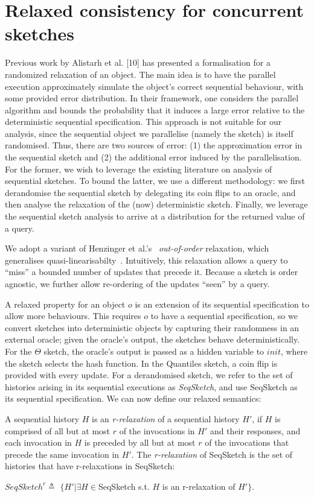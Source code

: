 \section{Relaxed consistency for concurrent sketches}
\label{sec:concurrentSketches}

Previous work by Alistarh et al. [10] has presented a formalisation for a randomized relaxation of an object.
The main idea is to have the parallel execution approximately simulate the object’s correct sequential behaviour, with some provided error distribution.
In their framework, one considers the parallel algorithm and bounds the probability that it induces a large error
 relative to the deterministic sequential specification.
This approach is not suitable for our analysis, since the sequential object we parallelise (namely the sketch) is
itself randomised. Thus, there are two sources of error: (1) the approximation error in the sequential sketch and
(2) the additional error induced by the parallelisation. For the former, we wish to leverage the
existing literature on analysis of sequential sketches. To bound the latter, we use a different
methodology: we first derandomise the sequential sketch by delegating its coin flips to an oracle,
and then analyse the relaxation of the (now) deterministic sketch. Finally, we leverage the sequential sketch
analysis to arrive at a distribution for the returned value of a query.


We adopt a variant of Henzinger et al.'s~\cite{Henzinger} {\emph{out-of-order}} relaxation,  
which generalises quasi-linearisabilty~\cite{afek2010quasi}.
Intuitively, this relaxation allows a query to ``miss'' a bounded number of updates that precede it.
Because a sketch is order agnostic, we further allow re-ordering of the updates ``seen'' by a query.

A relaxed property for an object $o$ is an
extension of its sequential specification to allow more behaviours.
This requires $o$ to have a sequential specification, so
we convert sketches into deterministic objects by capturing their randomness in an external oracle; 
given the oracle's output, the sketches behave deterministically.
For the $\Theta$ sketch, the oracle's output is passed as a hidden variable to $init$, where the sketch
selects the hash function. In the Quantiles sketch, a coin flip is provided with every update.
For a derandomised sketch, we refer to the set of histories arising in its sequential
executions as \emph{SeqSketch}, and use SeqSketch as its sequential specification.
We can now define our relaxed semantics:
\begin{definition}[r-relaxation]
  A sequential history $H$ is an \emph{r-relaxation} of a sequential history $H'$,
  if $H$ is comprised of all but at most $r$ of the invocations in $H'$ and their responses,
  and each invocation in $H$ is preceded by all but at most $r$ of the invocations that precede the 
  same invocation in $H'$. The \emph{r-relaxation} of SeqSketch is the set of histories
  that have r-relaxations in SeqSketch:
  
  $SeqSketch^r \triangleq $ $\{H'|\exists H\in$SeqSketch s.t. $H$ is an r-relaxation of $H'\}$.
  \label{def:r-relaxtion}
\end{definition}

